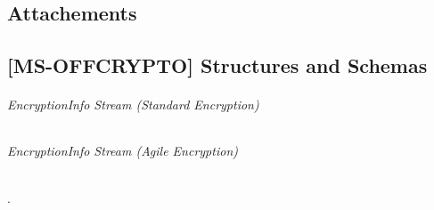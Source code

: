 \documentclass[11pt,oneside]{fithesis2}
\begin{document}
\begin{appendix}
	\chapter{Attachements}
	\section{[MS-OFFCRYPTO] Structures and Schemas}\label{msoffcrypto_structs}
	\subparagraph{EncryptionInfo Stream (Standard Encryption)}\label{ei_standardstream}

	\subparagraph{EncryptionInfo Stream (Agile Encryption)}\label{ei_agilestream}.
\end{appendix}
\end{document}
